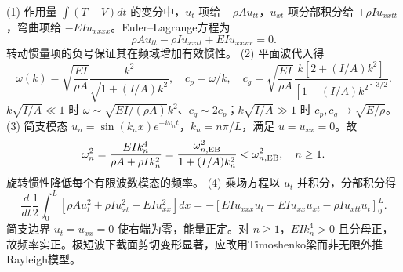 (1) 作用量 \(\int(T-V)dt\) 的变分中，\(u_t\) 项给 \(-\rho A u_{tt}\)，\(u_{xt}\) 项分部积分给 \(+\rho I u_{xxtt}\)，弯曲项给 \(-EIu_{xxxx}\)。Euler–Lagrange方程为
\[
\rho A u_{tt}-\rho I u_{xxtt}+EIu_{xxxx}=0.
\]
转动惯量项的负号保证其在频域增加有效惯性。
(2) 平面波代入得
\[
\omega(k)=\sqrt{\frac{EI}{\rho A}}\frac{k^2}{\sqrt{1+(I/A)k^2}},\quad
c_p=\omega/k,\quad
c_g=\sqrt{\frac{EI}{\rho A}}\frac{k[2+(I/A)k^2]}{[1+(I/A)k^2]^{3/2}}.
\]
\(k\sqrt{I/A}\ll1\) 时 \(\omega\sim\sqrt{EI/(\rho A)}k^2\)、\(c_g\sim2c_p\)；\(k\sqrt{I/A}\gg1\) 时 \(c_p,c_g\to\sqrt{E/\rho}\)。
(3) 简支模态 \(u_n=\sin(k_nx)e^{-i\omega_nt}\)，\(k_n=n\pi/L\)，满足 \(u=u_{xx}=0\)。故
\[
\omega_n^2=\frac{EI k_n^4}{\rho A+\rho I k_n^2}
=\frac{\omega_{n,\rm EB}^2}{1+(I/A)k_n^2}<\omega_{n,\rm EB}^2,\quad n\ge1.
\]
旋转惯性降低每个有限波数模态的频率。
(4) 乘场方程以 \(u_t\) 并积分，分部积分得
\[
\frac{d}{dt}\frac12\int_0^L[\rho A u_t^2+\rho Iu_{xt}^2+EIu_{xx}^2]dx
=-[EIu_{xxx}u_t-EIu_{xx}u_{xt}-\rho Iu_{xtt}u_t]_{0}^{L}.
\]
简支边界 \(u_t=u_{xx}=0\) 使右端为零，能量正定。对 \(n\ge1\)，\(EI k_n^4>0\) 且分母正，故频率实正。极短波下截面剪切变形显著，应改用Timoshenko梁而非无限外推Rayleigh模型。
